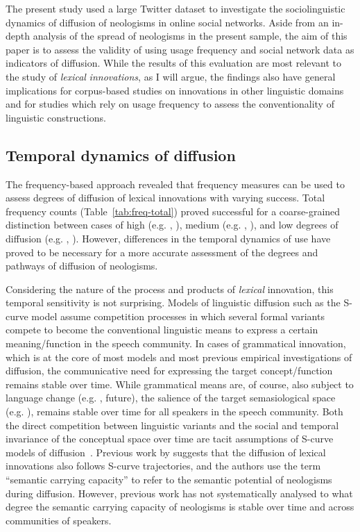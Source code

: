 \documentclass[
  a4paper,
  abstract=on,
  captions=tableabove
  ]{scrartcl}
\begin{document}
  The present study used a large Twitter dataset to investigate the sociolinguistic dynamics of diffusion of neologisms in online social networks. Aside from an in-depth analysis of the spread of neologisms in the present sample, the aim of this paper is to assess the validity of using usage frequency and social network data as indicators of diffusion. While the results of this evaluation are most relevant to the study of \emph{lexical} \emph{innovations}, as I will argue, the findings also have general implications for corpus-based studies on innovations in other linguistic domains and for studies which rely on usage frequency to assess the conventionality of linguistic constructions.

  \subsection{Temporal dynamics of diffusion}

    The frequency-based approach revealed that frequency measures can be used to assess degrees of diffusion of lexical innovations with varying success. Total frequency counts (Table~\ref{tab:freq-total}) proved successful for a coarse-grained distinction between cases of high (e.g. , ), medium (e.g. , ), and low degrees of diffusion (e.g. , ). However, differences in the temporal dynamics of use have proved to be necessary for a more accurate assessment of the degrees and pathways of diffusion of neologisms.

    Considering the nature of the process and products of \emph{lexical} innovation, this temporal sensitivity is not surprising. Models of linguistic diffusion such as the S-curve model assume competition processes in which several formal variants compete to become the conventional linguistic means to express a certain meaning/function in the speech community. In cases of grammatical innovation, which is at the core of most models and most previous empirical investigations of diffusion, the communicative need for expressing the target concept/function remains stable over time. While grammatical means are, of course, also subject to language change (e.g. ,  future), the salience of the target semasiological space (e.g. ), remains stable over time for all speakers in the speech community. Both the direct competition between linguistic variants and the social and temporal invariance of the conceptual space over time are tacit assumptions of S-curve models of diffusion~\parencite{Blythe2012ScurvesMechanisms}. Previous work by \textcite{Nini2017ApplicationGrowth} suggests that the diffusion of lexical innovations also follows S-curve trajectories, and the authors use the term \enquote{semantic carrying capacity} to refer to the semantic potential of neologisms during diffusion. However, previous work has not systematically analysed to what degree the semantic carrying capacity of neologisms is stable over time and across communities of speakers.
\end{document}
